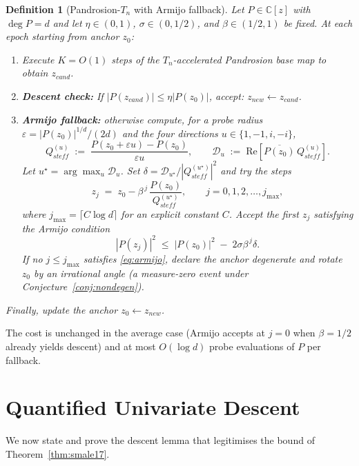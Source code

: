 \documentclass[11pt,a4paper]{article}
\newtheorem{definition}[theorem]{Definition}
\begin{document}
\begin{definition}[Pandrosion-$T_n$ with Armijo fallback]\label{def:armijo}
Let $P \in \mathbb{C}[z]$ with $\deg P = d$ and let $\eta \in (0, 1)$, $\sigma \in (0, 1/2)$, and $\beta \in (1/2, 1)$ be fixed. At each epoch starting from anchor $z_0$:
\begin{enumerate}
    \item Execute $K = O(1)$ steps of the $T_n$-accelerated Pandrosion base map to obtain $z_{cand}$.
    \item \textbf{Descent check:} If $|P(z_{cand})| \le \eta |P(z_0)|$, accept: $z_{new} \leftarrow z_{cand}$.
    \item \textbf{Armijo fallback:} otherwise compute, for a probe radius $\varepsilon = |P(z_0)|^{1/d}/(2d)$ and the four directions $u \in \{1, -1, i, -i\}$,
    $$ Q_{steff}^{(u)} \;:=\; \frac{P(z_0 + \varepsilon u) - P(z_0)}{\varepsilon u}, \qquad \mathcal{D}_u \;:=\; \mathrm{Re}\!\left[\overline{P(z_0)}\, Q_{steff}^{(u)}\right]. $$
    Let $u^\star = \arg\max_u \mathcal{D}_u$. Set $\delta = \mathcal{D}_{u^\star} / |Q_{steff}^{(u^\star)}|^2$ and try the steps
    $$ z_j \;=\; z_0 - \beta^{\,j}\, \frac{P(z_0)}{Q_{steff}^{(u^\star)}}, \qquad j = 0, 1, 2, \dots, j_{\max}, $$
    where $j_{\max} = \lceil C \log d \rceil$ for an explicit constant $C$. Accept the first $z_j$ satisfying the Armijo condition
    \begin{equation}
    |P(z_j)|^2 \;\le\; |P(z_0)|^2 \;-\; 2\sigma \beta^{\,j} \delta. \label{eq:armijo}
    \end{equation}
    If no $j \le j_{\max}$ satisfies \eqref{eq:armijo}, declare the anchor \emph{degenerate} and rotate $z_0$ by an irrational angle (a measure-zero event under Conjecture~\ref{conj:nondegen}).
\end{enumerate}
Finally, update the anchor $z_0 \leftarrow z_{new}$.
\end{definition}

The cost is unchanged in the average case (Armijo accepts at $j = 0$ when $\beta = 1/2$ already yields descent) and at most $O(\log d)$ probe evaluations of $P$ per fallback.

\section{Quantified Univariate Descent}\label{sec:quantified-descent}

We now state and prove the descent lemma that legitimises the bound of Theorem~\ref{thm:smale17}.
\end{document}
